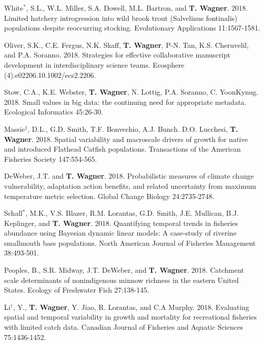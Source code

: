 \documentclass[10pt]{article}
\begin{document}
\begin{flushleft}
\begin{etaremune}[start=81]
\item White$^*$, S.L., W.L. Miller, S.A. Dowell, M.L. Bartron, and {\bf T. Wagner}.  2018. Limited hatchery introgression into wild brook trout (Salvelinus fontinalis) populations despite reoccurring stocking. Evolutionary Applications 11:1567-1581.

\item Oliver, S.K., C.E. Fergus, N.K. Skaff, {\bf T. Wagner}, P-N. Tan, K.S. Cheruvelil, and P.A. Soranno. 2018. Strategies for effective collaborative manuscript development in interdisciplinary science teams. Ecosphere (4):e02206.10.1002/ecs2.2206.

\item Stow, C.A., K.E. Webster, {\bf T. Wagner}, N. Lottig, P.A. Soranno, C. YoonKynug. 2018. Small values in big data: the continuing need for appropriate metadata. Ecological Informatics 45:26-30. 

\item Massie$^\ddagger$, D.L., G.D. Smith, T.F. Bonvechio, A.J. Bunch. D.O. Lucchesi, {\bf T. Wagner}. 2018. Spatial variability and macroscale drivers of growth for native and introduced Flathead Catfish populations. Transactions of the American Fisheries Society 147:554-565.

\item DeWeber, J.T. and {\bf T. Wagner}. 2018. Probabilistic measures of climate change vulnerability, adaptation action benefits, and related uncertainty from maximum temperature metric selection. Global Change Biology 24:2735-2748.

\item Schall$^*$, M.K., V.S. Blazer, R.M. Lorantas, G.D. Smith, J.E. Mullican, B.J. Keplinger, and {\bf T. Wagner}. 2018. Quantifying temporal trends in fisheries abundance using Bayesian dynamic linear models: A case-study of riverine smallmouth bass populations. North American Journal of Fisheries Management 38:493-501.

\item Peoples, B., S.R. Midway, J.T. DeWeber, and {\bf T. Wagner}. 2018. Catchment scale determinants of nonindigenous minnow richness in the eastern United States. Ecology of Freshwater Fish 27:138-145.

\item Li$^\dagger$, Y., {\bf T. Wagner}, Y. Jiao, R. Lorantas, and C.A Murphy. 2018. Evaluating spatial and temporal variability in growth and mortality for recreational fisheries with limited catch data. Canadian Journal of Fisheries and Aquatic Sciences 75:1436-1452.


\end{etaremune}
\end{flushleft}
\end{document}
